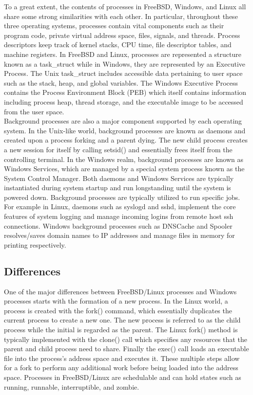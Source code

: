 \documentclass[letterpaper,10pt,titlepage]{article}
\begin{document}
To a great extent, the contents of processes in FreeBSD, Windows, and Linux all share some strong similarities with each other.  In particular, throughout these three operating systems, processes contain vital components such as their program code, private virtual address space, files, signals, and threads.  Process descriptors keep track of kernel stacks, CPU time, file descriptor tables, and machine registers.  In FreeBSD and Linux, processes are represented a structure known as a task\_struct while in Windows, they are represented by an Executive Process.  The Unix task\_struct includes accessible data pertaining to user space such as the stack, heap, and global variables.  The Windows Executive Process contains the Process Environment Block (PEB) which itself contains information including process heap, thread storage, and the executable image to be accessed from the user space.\cite{mwi1}\\

Background processes are also a major component supported by each operating system.  In the Unix-like world, background processes are known as daemons and created upon a process forking and a parent dying.  The new child process creates a new session for itself by calling setsid() and essentially frees itself from the controlling terminal.\cite{lkd4}  In the Windows realm, background processes are known as Windows Services, which are managed by a special system process known as the System Control Manager.\cite{mwi5}  Both daemons and Windows Services are typically instantiated during system startup and run longstanding until the system is powered down.  Background processes are typically utilized to run specific jobs.  For example in Linux, daemons such as syslogd and sshd, implement the core features of system logging and manage incoming logins from remote host ssh connections.\cite{syslogd} Windows background processes such as DNSCache and Spooler resolves/saves domain names to IP addresses and manage files in memory for printing respectively.\cite{mwi2}

\subsection{Differences}

One of the major differences between FreeBSD/Linux processes and Windows processes starts with the formation of a new process.  In the Linux world, a process is created with the fork() command, which essentially duplicates the current process to create a new one.  The new process is referred to as the child process while the initial is regarded as the parent.  The Linux fork() method is typically implemented with the clone() call which specifies any resources that the parent and child process need to share.  Finally the exec() call loads an executable file into the process's address space and executes it.  These multiple steps allow for a fork to perform any additional work before being loaded into the address space.  Processes in FreeBSD/Linux are schedulable and can hold states such as running, runnable, interruptible, and zombie.\cite{lkd3}\\
\end{document}

